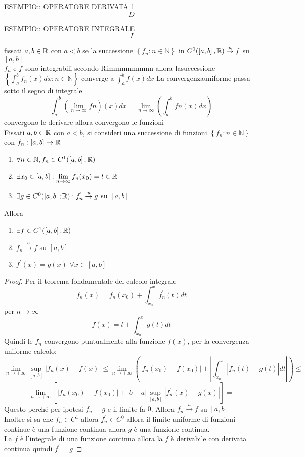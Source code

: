 ESEMPIO:: OPERATORE DERIVATA 1\\
$$D$$

ESEMPIO:: OPERATORE INTEGRALE\\
$$I$$

\proposition
fissati $a,b\in \mathbb{R}$ con $a<b$ se la successione $\left\{f_n:n\in\mathbb{N}\right\}$ in $C^0(\left[a,b\right], \mathbb{R})\overset{u}{\to}f$ su $\left[a,b\right]$\\
$f_n$ e $f$ sono integrabili secondo Rimmmmmmmn allora lasuccessione $\left\{\int_a^bf_n(x)dx:n\in\mathbb{N}\right\}$ converge a $\int_a^bf(x)dx$
\observation
La convergenzauniforme passa sotto il segno di integrale 
$$\int_a^b\left(\lim\limits_{n\to\infty}fn\right)(x)dx=\lim\limits_{n\to\infty}\left(\int_a^bfn(x)dx\right)$$
\proposition convergono le derivare allora convergono le funzioni\\
Fissati $a,b\in \mathbb{R}$ con $a<b$, si consideri una successione di funzioni $\left\{f_n:n\in\mathbb{N}\right\}$ con $f_n:\left[a,b\right]\to \mathbb{R}$
\begin{enumerate}
	\item $\forall n\in\mathbb{N}, f_n\in C^1(\left[a,b\right]; \mathbb{R})$
	\item $\exists x_0\in\left[a,b\right]: \lim\limits_{n\to\infty}f_n(x_0)=l\in \mathbb{R}$
	\item $\exists g \in C^0(\left[a,b\right]; \mathbb{R}):f^{'}_n\overset{u}{\to}g$ su $\left[a,b\right]$
\end{enumerate}
Allora
\begin{enumerate}
	\item $\exists f\in C^1(\left[a,b\right]; \mathbb{R})$
	\item $f_n\overset{u}{\to}f$ su $\left[a,b\right]$
	\item $f^{'}(x)=g(x)$ $\forall x\in\left[a,b\right]$
\end{enumerate}
\begin{proof}
	Per il teorema fondamentale del calcolo integrale
	$$f_n(x)=f_n(x_0)+\int_{x_0}^{x}f_n^{'}(t)dt$$
	per $n\to\infty$
	$$f(x)=l+\int_{x_0}^{x}g(t)dt$$
	Quindi le $f_n$ convergono puntualmente alla funzione $f(x)$, per la convergenza uniforme calcolo:
	$$ \lim\limits_{n\to+\infty}\sup\limits_{\left[a,b\right]}\left|f_n(x)-f(x)\right|\le\lim\limits_{n\to+\infty}\left(  \left| f_n(x_0)-f(x_0) \right|+\left|\int_{x_0}^x\left|f_n^{'}(t)-g(t)\right|dt\right| \right)\le$$
	$$\lim\limits_{n\to+\infty}\left[ \left|f_n(x_0)-f(x_0)\right|+\left|b-a\right|\sup\limits_{\left[a,b\right]}\left|f_n^{'}(x)-g(x)\right| \right] = $$
	Questo perché per ipotesi $f^{'}_n=g$ e il limite fa $0$.
	Allora $f_n\overset{u}{\to}f$ su $\left[a,b\right]$\\
	Inoltre si sa che $f_n\in C^1$ allora $f_n^{'}\in C^0$ allora il limite uniforme di funzioni continue è una funzione continua allora $g$ è una funzione continua.\\
	La $f$ è l'integrale di una funzione continua allora la $f$ è derivabile con derivata continua quindi $f^{'}=g$
\end{proof}
